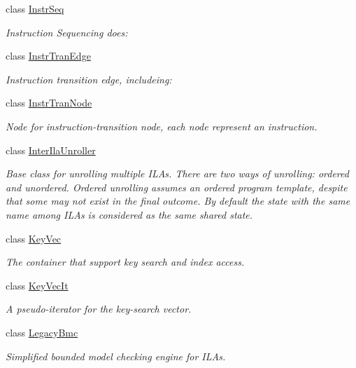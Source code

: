 \begin{DoxyCompactItemize}
class \mbox{\hyperlink{classilang_1_1_instr_seq}{Instr\+Seq}}
\begin{DoxyCompactList}\small\item\em Instruction Sequencing does\+: \end{DoxyCompactList}\item 
class \mbox{\hyperlink{classilang_1_1_instr_tran_edge}{Instr\+Tran\+Edge}}
\begin{DoxyCompactList}\small\item\em Instruction transition edge, includeing\+: \end{DoxyCompactList}\item 
class \mbox{\hyperlink{classilang_1_1_instr_tran_node}{Instr\+Tran\+Node}}
\begin{DoxyCompactList}\small\item\em Node for instruction-\/transition node, each node represent an instruction. \end{DoxyCompactList}\item 
class \mbox{\hyperlink{classilang_1_1_inter_ila_unroller}{Inter\+Ila\+Unroller}}
\begin{DoxyCompactList}\small\item\em Base class for unrolling multiple I\+L\+As. There are two ways of unrolling\+: ordered and unordered. Ordered unrolling assumes an ordered program template, despite that some may not exist in the final outcome. By default the state with the same name among I\+L\+As is considered as the same shared state. \end{DoxyCompactList}\item 
class \mbox{\hyperlink{classilang_1_1_key_vec}{Key\+Vec}}
\begin{DoxyCompactList}\small\item\em The container that support key search and index access. \end{DoxyCompactList}\item 
class \mbox{\hyperlink{classilang_1_1_key_vec_it}{Key\+Vec\+It}}
\begin{DoxyCompactList}\small\item\em A pseudo-\/iterator for the key-\/search vector. \end{DoxyCompactList}\item 
class \mbox{\hyperlink{classilang_1_1_legacy_bmc}{Legacy\+Bmc}}
\begin{DoxyCompactList}\small\item\em Simplified bounded model checking engine for I\+L\+As. \end{DoxyCompactList}\item 

\end{DoxyCompactItemize}
